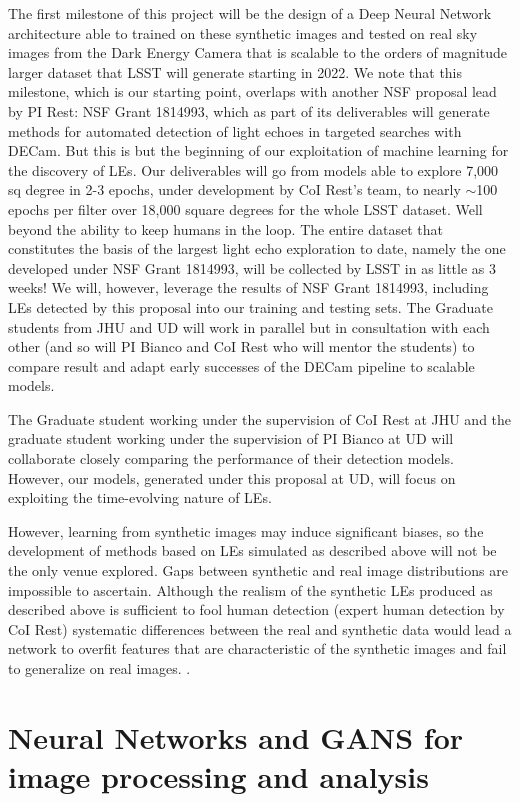 \documentclass{proposalnsf}
\begin{document}
The first milestone of this project will be the design of a Deep Neural Network architecture able to trained on these synthetic images and tested on real sky images from the Dark Energy Camera that is scalable to the orders of magnitude larger dataset that LSST will generate starting in 2022. We note that this milestone, which is our starting point, overlaps with another NSF proposal lead by PI Rest: NSF Grant 1814993, which as part of its deliverables will generate methods for automated detection of light echoes in targeted searches with DECam. But this is but the beginning of our exploitation of machine learning for the discovery of LEs. Our deliverables will go from models able to explore 7,000 sq degree in 2-3 epochs, under development by CoI Rest's team, to nearly $\sim$100 epochs per filter over 18,000 square degrees for the whole LSST dataset. Well beyond the ability to keep humans in the loop. The entire dataset that constitutes the basis of the largest light echo exploration to date, namely the one developed under NSF Grant 1814993, will be collected by LSST in as little as 3 weeks!
We will, however, leverage the results of NSF Grant 1814993, including LEs detected by this proposal into our training and testing sets. The Graduate students from JHU and UD will work in parallel but in consultation with each other (and so will PI Bianco and CoI Rest who will mentor the students) to compare result and adapt early successes of the DECam pipeline to scalable models.

 The Graduate student working under the supervision of CoI Rest at JHU and the graduate student working under the supervision of PI Bianco at UD will collaborate closely comparing the performance of their detection models. However, our models, generated under this proposal at UD, will focus on exploiting the time-evolving nature of LEs. 


However, learning from synthetic
images may induce significant biases, so the development of methods based on LEs simulated as described above will not be the only venue explored.  Gaps between synthetic and real image distributions are impossible to ascertain.  Although the realism of the synthetic LEs produced as described above is sufficient to fool human detection (expert human detection by CoI Rest) systematic differences between the real and synthetic data would lead a network to overfit features that are characteristic of the synthetic images and fail to
generalize on real images.  \citep{Shrivastava_2017_CVPR}.  


\section{Neural Networks and GANS for image processing and analysis}
\end{document}
